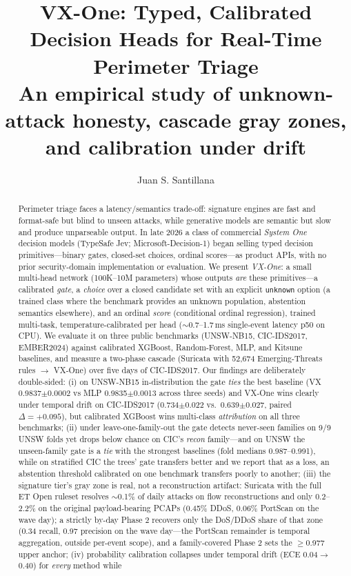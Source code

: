 \documentclass[sigconf,anonymous=false]{acmart}
\begin{document}
\title{VX-One: Typed, Calibrated Decision Heads for Real-Time Perimeter Triage\\
  {\normalsize An empirical study of unknown-attack honesty, cascade gray zones, and calibration under drift}}

\author{Juan S. Santillana}

\begin{abstract}
Perimeter triage faces a latency/semantics trade-off: signature engines are fast and format-safe but blind to unseen attacks, while generative models are semantic but slow and produce unparseable output. In late 2026 a class of commercial \emph{System One} decision models (TypeSafe Jev; Microsoft-Decision-1) began selling typed decision primitives---binary gates, closed-set choices, ordinal scores---as product APIs, with no prior security-domain implementation or evaluation. We present \emph{VX-One}: a small multi-head network (100K--10M parameters) whose outputs \emph{are} these primitives—a calibrated \emph{gate}, a \emph{choice} over a closed candidate set with an explicit \texttt{unknown} option (a trained class where the benchmark provides an unknown population, abstention semantics elsewhere), and an ordinal \emph{score} (conditional ordinal regression), trained multi-task, temperature-calibrated per head ($\sim$0.7--1.7\,ms single-event latency p50 on CPU). We evaluate it on three public benchmarks (UNSW-NB15, CIC-IDS2017, EMBER2024) against calibrated XGBoost, Random-Forest, MLP, and Kitsune baselines, and measure a two-phase cascade (Suricata with 52{,}674 Emerging-Threats rules $\to$ VX-One) over five days of CIC-IDS2017. Our findings are deliberately double-sided: (i) on UNSW-NB15 in-distribution the gate \emph{ties} the best baseline (VX 0.9837$\pm$0.0002 vs MLP 0.9835$\pm$0.0013 across three seeds) and VX-One wins clearly under temporal drift on CIC-IDS2017 (0.734$\pm$0.022 vs.\ 0.639$\pm$0.027, paired $\Delta{=}{+}0.095$), but calibrated XGBoost wins multi-class \emph{attribution} on all three benchmarks; (ii) under leave-one-family-out the gate detects never-seen families on 9/9 UNSW folds yet drops below chance on CIC's \emph{recon} family---and on UNSW the unseen-family gate is a \emph{tie} with the strongest baselines (fold medians 0.987--0.991), while on stratified CIC the trees' gate transfers better and we report that as a loss, an abstention threshold calibrated on one benchmark transfers poorly to another; (iii) the signature tier's gray zone is real, not a reconstruction artifact: Suricata with the full ET Open ruleset resolves $\sim$0.1\% of daily attacks on flow reconstructions and only 0.2--2.2\% on the original payload-bearing PCAPs (0.45\% DDoS, 0.06\% PortScan on the wave day); a strictly by-day Phase 2 recovers only the DoS/DDoS share of that zone (0.34 recall, 0.97 precision on the wave day---the PortScan remainder is temporal aggregation, outside per-event scope), and a family-covered Phase 2 sets the $\ge$0.977 upper anchor; (iv) probability calibration collapses under temporal drift (ECE 0.04$\to$0.40) for \emph{every} method while 
\end{abstract}
\end{document}
